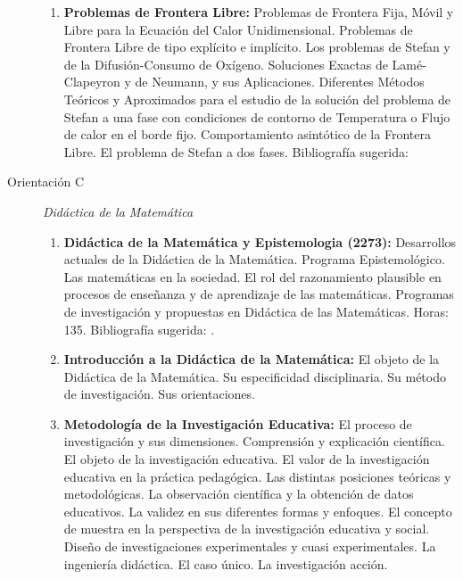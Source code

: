 \documentclass[a4paper, 12pt]{article}
\begin{document}
\begin{description}
\begin{enumerate}
 


\item\textbf{Problemas de Frontera Libre:} Problemas de Frontera Fija, Móvil
y Libre para la Ecuación del Calor Unidimensional. Problemas de
Frontera Libre de tipo explícito e implícito. Los problemas de
Stefan y de la Difusión-Consumo de Oxígeno. Soluciones Exactas de
Lamé-Clapeyron y de Neumann, y sus Aplicaciones. Diferentes
Métodos Teóricos y Aproximados para el estudio de la solución del
problema de Stefan a una fase con condiciones de contorno de
Temperatura o Flujo de calor en el borde fijo. Comportamiento
asintótico de la Frontera Libre. El problema de Stefan a dos
fases. Bibliografía  sugerida: \cite{hill,tarzia}



\end{enumerate}

\item[Orientación C]\emph{Didáctica de la Matemática}

\begin{enumerate}
\item\textbf{ Didáctica de la Matemática y Epistemologia (2273):} Desarrollos actuales de la Didáctica de la Matemática. Programa Epistemológico. Las matemáticas en la sociedad. El rol del razonamiento plausible en procesos de enseñanza y de aprendizaje de las matemáticas.  Programas de investigación y propuestas en Didáctica de las Matemáticas. Horas: 135. Bibliografía sugerida: \cite{chevallard, brousseau1986fundamentos,godino2012origen}.



\item  \textbf{Introducción a la Didáctica de la Matemática:} El objeto de la Didáctica de la
Matemática. Su especificidad disciplinaria. Su método de
investigación. Sus orientaciones.


\item\textbf{Metodología de la Investigación Educativa:} El proceso
de investigación y sus dimensiones. Comprensión y explicación
científica. El objeto de la investigación educativa. El valor de
la investigación educativa en la práctica pedagógica. Las
distintas posiciones teóricas y metodológicas. La observación
científica y la obtención de datos educativos. La validez en sus
diferentes formas y enfoques. El concepto de muestra en la
perspectiva de la investigación educativa y social. Diseño de
investigaciones experimentales y cuasi experimentales. La
ingeniería didáctica. El caso único. La investigación acción.




\end{enumerate}
\end{description}
\end{document}
